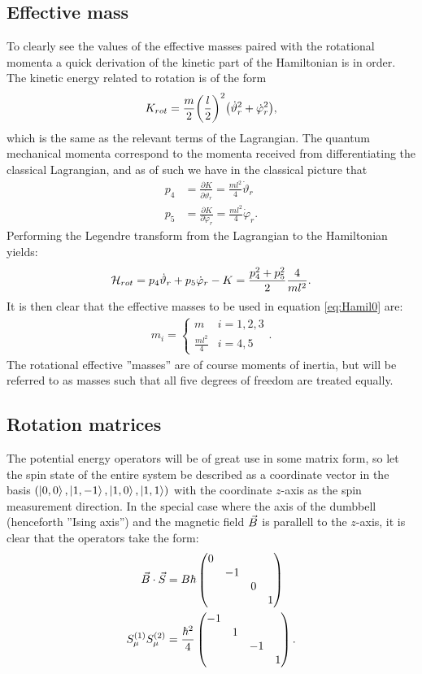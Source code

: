\documentclass[a4paper]{article}
\begin{document}
\subsection{Effective mass}
To clearly see the values of the effective masses paired with the rotational momenta a quick derivation
of the kinetic part of the Hamiltonian is in order. The kinetic energy related to rotation
is of the form \[
K_{rot}= \frac{m}{2}\pqty{\frac{l}{2}}^2\pqty{\dot \vartheta_r^2 + \dot \varphi_r^2} %
,\] 
which is the same as the relevant terms of the Lagrangian. The quantum mechanical momenta
correspond to the momenta received from differentiating the classical Lagrangian, and as
of %
such we have in the classical picture that 
\begin{align*}
        p_4 &= \frac{\partial K}{\partial \dot \vartheta_r} = \frac{ml^2}{4}\dot \vartheta_r\\
        p_5 &= \frac{\partial K}{\partial \dot \varphi_r} = \frac{ml^2}{4}\dot \varphi_r
.\end{align*}
Performing the Legendre transform from the Lagrangian to the Hamiltonian yields:
\begin{align*}
        \mathbb{\cal H}_{rot}= p_4 \dot\vartheta_r + p_5 \dot\varphi_r - K = \frac{
        p_4^2 + p_5^2}{2} \frac{4}{ml^2}
.\end{align*}
It is then clear that the effective masses to be used in equation \ref{eq:Hamil0} are:
\begin{align*}
        m_i = \begin{cases}
                m & i = 1, 2, 3\\
                \frac{ml^2}{4} & i = 4, 5
        \end{cases}
.\end{align*}
The rotational effective ''masses'' are of course moments of inertia, but will be
referred to as masses such that all five degrees of freedom are treated equally.

\subsection{Rotation matrices}
The potential energy operators will be of great use in some matrix form, so let the spin
state of the entire system be described as a coordinate vector in the basis \((\ket{0, 0}, \ket{1, -1}, \ket{1, 0},
\ket{1, 1})\) with the coordinate \(z\)-axis as the spin measurement direction. In the special case where the axis of the dumbbell (henceforth ''Ising
axis'') and the magnetic field \(\vec{B}\) is parallell to the \(z\)-axis, it is clear that the operators take the form:
\begin{align}
        \va{B}\cdot \va{S} &= B\hbar \label{eq:BSmat}
        \begin{pmatrix}
        \dmat{0,-1,0,1}
        \end{pmatrix} \\
        S^{(1)}_{\mu}S^{(2)}_{\mu} &= \frac{\hbar^2}{4} \label{eq:SSmat}
        \begin{pmatrix} 
        \diagonalmatrix{-1,1,-1,1}\end{pmatrix} 
.\end{align}
\end{document}
